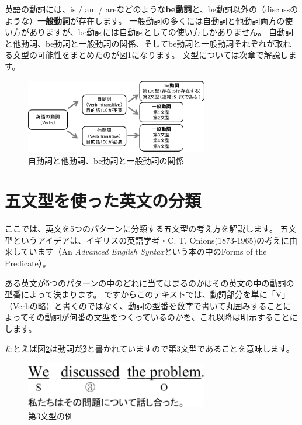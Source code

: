 \documentclass[12pt,titlepage]{jsarticle}
\def\maru#1{\textcircled{\scriptsize#1}}%
\begin{document}
  英語の動詞には、is / am / areなどのような{\bf be動詞}と、be動詞以外の（discussのような）{\bf 一般動詞}が存在します。
  一般動詞の多くには自動詞と他動詞両方の使い方がありますが、be動詞には自動詞としての使い方しかありません。
  自動詞と他動詞、be動詞と一般動詞の関係、そしてbe動詞と一般動詞それぞれが取れる文型の可能性をまとめたのが図\ref{fig11}になります。
  文型については次章で解説します。
  \begin{figure}[htbp]
   \begin{center}
    \includegraphics[width=8cm]{./figure/fig11.pdf}
    \caption{自動詞と他動詞、be動詞と一般動詞の関係}
    \label{fig11}
   \end{center}
  \end{figure}


  \section{五文型を使った英文の分類}
  ここでは、英文を5つのパターンに分類する五文型の考え方を解説します。
  五文型というアイデアは、イギリスの英語学者・C. T. Onions(1873-1965)の考えに由来しています（An {\it Advanced English Syntax}という本の中のForms of the Predicate）。

  ある英文が5つのパターンの中のどれに当てはまるのかはその英文の中の動詞の型番によって決まります。
  ですからこのテキストでは、動詞部分を単に「V」（Verbの略）と書くのではなく、動詞の型番を数字で書いて丸囲みすることによってその動詞が何番の文型をつくっているのかを、これ以降は明示することにします。
  
たとえば図\ref{fig12}は動詞が\maru{3}と書かれていますので第3文型であることを意味します。
  \begin{figure}[htbp]
   \begin{center}
    \includegraphics[width=8cm]{./figure/fig12.pdf}
    \caption{第3文型の例}
    \label{fig12}
   \end{center}
  \end{figure}
\end{document}
